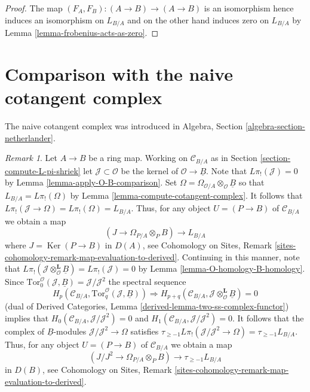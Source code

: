 \documentclass{stacks-project}
\theoremstyle{plain}
\theoremstyle{definition}
\theoremstyle{remark}
\newtheorem{remark}[subsection]{Remark}
\numberwithin{equation}{subsection}
\def\Ker{\mathop{\mathrm{Ker}}}
\begin{document}
\begin{proof}
The map $(F_A, F_B) : (A \to B) \to (A \to B)$ is an isomorphism
hence induces an isomorphism on $L_{B/A}$ and on the other hand
induces zero on $L_{B/A}$ by Lemma \ref{lemma-frobenius-acts-as-zero}.
\end{proof}





\section{Comparison with the naive cotangent complex}
\label{section-surjections}

\noindent
The naive cotangent complex was introduced in
Algebra, Section \ref{algebra-section-netherlander}.

\begin{remark}
\label{remark-make-map}
Let $A \to B$ be a ring map.  Working on $\mathcal{C}_{B/A}$ as in
Section \ref{section-compute-L-pi-shriek} let
$\mathcal{J} \subset \mathcal{O}$ be the kernel of
$\mathcal{O} \to \underline{B}$. Note that $L\pi_!(\mathcal{J}) = 0$ by
Lemma \ref{lemma-apply-O-B-comparison}. Set
$\Omega =  \Omega_{\mathcal{O}/A} \otimes_\mathcal{O} \underline{B}$
so that
$L_{B/A} = L\pi_!(\Omega)$ by Lemma \ref{lemma-compute-cotangent-complex}.
It follows that $L\pi_!(\mathcal{J} \to \Omega) = L\pi_!(\Omega) = L_{B/A}$.
Thus, for any object $U = (P \to B)$ of $\mathcal{C}_{B/A}$ we obtain a map
\begin{equation}
\label{equation-comparison-map-A}
(J \to \Omega_{P/A} \otimes_P B) \longrightarrow L_{B/A}
\end{equation}
where $J = \Ker(P \to B)$ in $D(A)$, see
Cohomology on Sites, Remark
\ref{sites-cohomology-remark-map-evaluation-to-derived}.
Continuing in this manner, note that
$L\pi_!(\mathcal{J} \otimes_\mathcal{O}^\mathbf{L} \underline{B}) =
L\pi_!(\mathcal{J}) = 0$ by
Lemma \ref{lemma-O-homology-B-homology}.
Since $\text{Tor}_0^\mathcal{O}(\mathcal{J}, \underline{B}) =
\mathcal{J}/\mathcal{J}^2$
the spectral sequence
$$
H_p(\mathcal{C}_{B/A}, \text{Tor}_q^\mathcal{O}(\mathcal{J}, \underline{B}))
\Rightarrow 
H_{p + q}(\mathcal{C}_{B/A},
\mathcal{J} \otimes_\mathcal{O}^\mathbf{L} \underline{B}) = 0
$$
(dual of
Derived Categories, Lemma \ref{derived-lemma-two-ss-complex-functor})
implies that
$H_0(\mathcal{C}_{B/A}, \mathcal{J}/\mathcal{J}^2) = 0$
and $H_1(\mathcal{C}_{B/A}, \mathcal{J}/\mathcal{J}^2) = 0$.
It follows that the complex of $\underline{B}$-modules
$\mathcal{J}/\mathcal{J}^2 \to \Omega$ satisfies
$\tau_{\geq -1}L\pi_!(\mathcal{J}/\mathcal{J}^2 \to \Omega) =
\tau_{\geq -1}L_{B/A}$.
Thus, for any object $U = (P \to B)$ of $\mathcal{C}_{B/A}$ we obtain a map
\begin{equation}
\label{equation-comparison-map}
(J/J^2 \to \Omega_{P/A} \otimes_P B) \longrightarrow \tau_{\geq -1}L_{B/A}
\end{equation}
in $D(B)$, see
Cohomology on Sites, Remark
\ref{sites-cohomology-remark-map-evaluation-to-derived}.
\end{remark}
\end{document}

